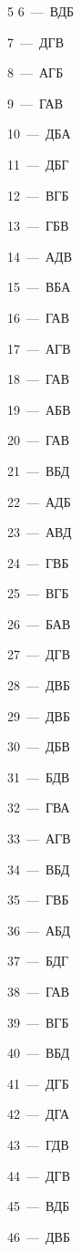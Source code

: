 \documentclass[12pt]{article}
\begin{document}
\begin{multicols}{5}\noindent
\mbox{6~--- ВДБ}\par
\mbox{7~--- ДГВ}\par
\mbox{8~--- АГБ}\par
\mbox{9~--- ГАВ}\par
\mbox{10~--- ДБА}\par
\mbox{11~--- ДБГ}\par
\mbox{12~--- ВГБ}\par
\mbox{13~--- ГБВ}\par
\mbox{14~--- АДВ}\par
\mbox{15~--- ВБА}\par
\mbox{16~--- ГАВ}\par
\mbox{17~--- АГВ}\par
\mbox{18~--- ГАВ}\par
\mbox{19~--- АБВ}\par
\mbox{20~--- ГАВ}\par
\mbox{21~--- ВБД}\par
\mbox{22~--- АДБ}\par
\mbox{23~--- АВД}\par
\mbox{24~--- ГВБ}\par
\mbox{25~--- ВГБ}\par
\mbox{26~--- БАВ}\par
\mbox{27~--- ДГВ}\par
\mbox{28~--- ДВБ}\par
\mbox{29~--- ДВБ}\par
\mbox{30~--- ДБВ}\par
\mbox{31~--- БДВ}\par
\mbox{32~--- ГВА}\par
\mbox{33~--- АГВ}\par
\mbox{34~--- ВБД}\par
\mbox{35~--- ГВБ}\par
\mbox{36~--- АБД}\par
\mbox{37~--- БДГ}\par
\mbox{38~--- ГАВ}\par
\mbox{39~--- ВГБ}\par
\mbox{40~--- ВБД}\par
\mbox{41~--- ДГБ}\par
\mbox{42~--- ДГА}\par
\mbox{43~--- ГДВ}\par
\mbox{44~--- ДГВ}\par
\mbox{45~--- ВДБ}\par
\mbox{46~--- ДВБ}\par

\end{multicols}
\end{document}
